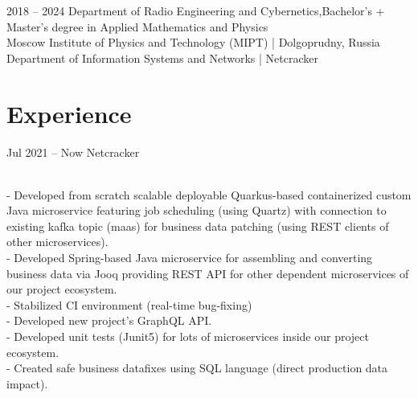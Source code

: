 \documentclass[]{cv-style}          %
\begin{document}
\begin{entrylist}
\entry
{2018 -- 2024}
{{Department of Radio Engineering and Cybernetics,\newline Bachelor's + Master's degree in Applied Mathematics and Physics}}
{\\ Moscow Institute of Physics and Technology (MIPT)  |  Dolgoprudny, Russia \\Department of Information Systems and Networks | Netcracker}
{\vspace{-0.3cm}}
\end{entrylist}



\section{Experience}

\begin{entrylist}

\entry
    {Jul 2021 -- Now}
    {Netcracker}
    {}
    {
    \\- Developed from scratch scalable deployable Quarkus-based containerized custom Java microservice featuring job scheduling (using Quartz) with connection to existing kafka topic (maas) for business data patching (using REST clients of other microservices). 
    \\- Developed Spring-based Java microservice for assembling and converting business data via Jooq providing REST API for other dependent microservices of our project ecosystem.
    \\ - Stabilized CI environment (real-time bug-fixing)
    \\ - Developed new project's GraphQL API.
    \\ - Developed unit tests (Junit5) for lots of microservices inside our project ecosystem.
    \\ - Created safe business datafixes using SQL language (direct production data impact).   
    
}

\end{entrylist}
\end{document}
